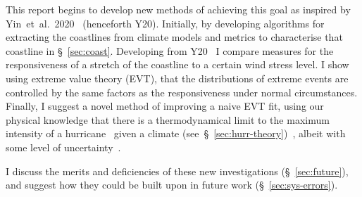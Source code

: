 This report begins to develop new methods of achieving this goal
as inspired by Yin~et~al.~2020~\cite{ZannaPreprint} (henceforth Y20). Initially, by
developing algorithms for extracting the coastlines from climate models
and metrics to characterise that coastline in §~\ref{sec:coast}.
Developing from Y20~\cite{ZannaPreprint} I compare measures for the
responsiveness of a stretch of the coastline to a certain wind stress
level. I show using extreme value theory (EVT), that the
distributions of extreme events are controlled by the same factors as
the responsiveness under normal circumstances. Finally, I suggest a
novel method of improving a naive EVT fit, using our physical knowledge
that there is a thermodynamical limit to the maximum intensity of a hurricane~\cite{emanuel1999thermodynamic}
 given a climate (see~§~\ref{sec:hurr-theory})~\cite{emanuel1987dependence}, albeit with some level of
 uncertainty~\cite{emanuel2016predictability}.


I discuss the merits and deficiencies of these new investigations (§~\ref{sec:future}),
and suggest how they could be built upon in future work (§~\ref{sec:sys-errors}).
